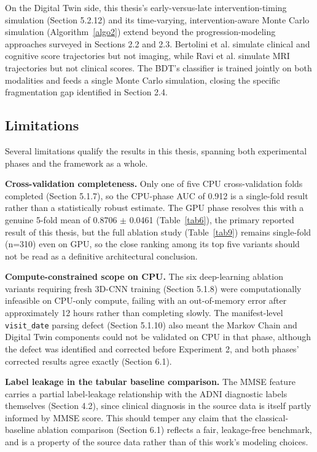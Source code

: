 \documentclass[pdflatex,sn-mathphys-num]{sn-jnl}%
\theoremstyle{thmstyleone}%
\theoremstyle{thmstyletwo}%
\theoremstyle{thmstylethree}%
\begin{document}
On the Digital Twin side, this thesis's early-versus-late intervention-timing simulation (Section 5.2.12) and its time-varying, intervention-aware Monte Carlo simulation (Algorithm~\ref{algo2}) extend beyond the progression-modeling approaches surveyed in Sections 2.2 and 2.3. Bertolini et al. \cite{bib10} simulate clinical and cognitive score trajectories but not imaging, while Ravi et al. \cite{bib29} simulate MRI trajectories but not clinical scores. The BDT's classifier is trained jointly on both modalities and feeds a single Monte Carlo simulation, closing the specific fragmentation gap identified in Section 2.4.

\subsection{Limitations}\label{sec6_3}

Several limitations qualify the results in this thesis, spanning both experimental phases and the framework as a whole.

\textbf{Cross-validation completeness.} Only one of five CPU cross-validation folds completed (Section 5.1.7), so the CPU-phase AUC of 0.912 is a single-fold result rather than a statistically robust estimate. The GPU phase resolves this with a genuine 5-fold mean of 0.8706 $\pm$ 0.0461 (Table~\ref{tab6}), the primary reported result of this thesis, but the full ablation study (Table~\ref{tab9}) remains single-fold (n=310) even on GPU, so the close ranking among its top five variants should not be read as a definitive architectural conclusion.

\textbf{Compute-constrained scope on CPU.} The six deep-learning ablation variants requiring fresh 3D-CNN training (Section 5.1.8) were computationally infeasible on CPU-only compute, failing with an out-of-memory error after approximately 12 hours rather than completing slowly. The manifest-level \texttt{visit\_date} parsing defect (Section 5.1.10) also meant the Markov Chain and Digital Twin components could not be validated on CPU in that phase, although the defect was identified and corrected before Experiment 2, and both phases' corrected results agree exactly (Section 6.1).

\textbf{Label leakage in the tabular baseline comparison.} The MMSE feature carries a partial label-leakage relationship with the ADNI diagnostic labels themselves (Section 4.2), since clinical diagnosis in the source data is itself partly informed by MMSE score. This should temper any claim that the classical-baseline ablation comparison (Section 6.1) reflects a fair, leakage-free benchmark, and is a property of the source data rather than of this work's modeling choices.
\end{document}
